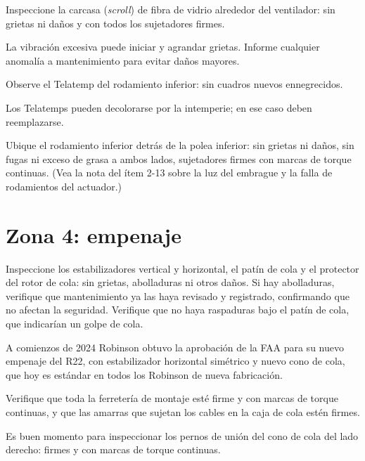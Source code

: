 Inspeccione la carcasa (\emph{scroll}) de fibra de vidrio alrededor del ventilador: sin grietas ni daños y con todos los sujetadores firmes.

\begin{nota}
La vibración excesiva puede iniciar y agrandar grietas. Informe cualquier anomalía a mantenimiento para evitar daños mayores.
\end{nota}

Observe el Telatemp del rodamiento inferior: sin cuadros nuevos ennegrecidos.

\begin{nota}
Los Telatemps pueden decolorarse por la intemperie; en ese caso deben reemplazarse.
\end{nota}

Ubique el rodamiento inferior detrás de la polea inferior: sin grietas ni daños, sin fugas ni exceso de grasa a ambos lados, sujetadores firmes con marcas de torque continuas. (Vea la nota del ítem 2-13 sobre la luz del embrague y la falla de rodamientos del actuador.)

\section{Zona 4: empenaje}

Inspeccione los estabilizadores vertical y horizontal, el patín de cola y el protector del rotor de cola: sin grietas, abolladuras ni otros daños. Si hay abolladuras, verifique que mantenimiento ya las haya revisado y registrado, confirmando que no afectan la seguridad. Verifique que no haya raspaduras bajo el patín de cola, que indicarían un golpe de cola.

\begin{nota}
A comienzos de 2024 Robinson obtuvo la aprobación de la FAA para su nuevo empenaje del R22, con estabilizador horizontal simétrico y nuevo cono de cola, que hoy es estándar en todos los Robinson de nueva fabricación.
\end{nota}

Verifique que toda la ferretería de montaje esté firme y con marcas de torque continuas, y que las amarras que sujetan los cables en la caja de cola estén firmes.

\begin{nota}
Es buen momento para inspeccionar los pernos de unión del cono de cola del lado derecho: firmes y con marcas de torque continuas.
\end{nota}

